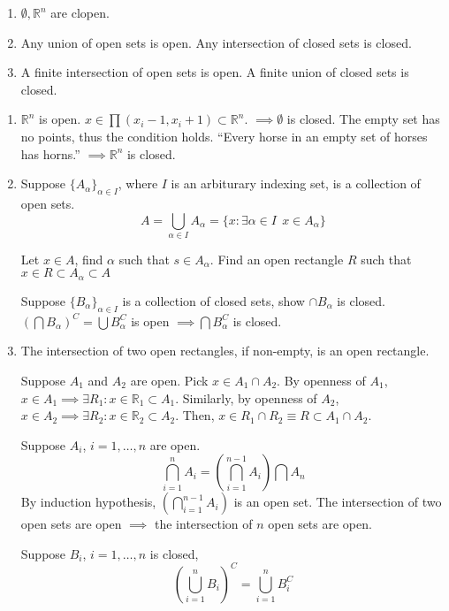 \documentclass[a4paper]{article}
\numberwithin{equation}{section}
\newcommand{\R}{\mathbb{R}}
\begin{document}
\begin{theorem}
    \begin{enumerate}
        \item $\emptyset,\R^n$ are clopen.
        \item Any union of open sets is open. Any intersection of closed sets is closed.
        \item A finite intersection of open sets is open. A finite union of closed sets is closed.
    \end{enumerate}
    \begin{prooof}
        \begin{enumerate}
            \item $\R^n$ is open. $x\in\prod(x_i-1,x_i+1)\subset\R^n$. $\implies\emptyset$ is closed. The empty set has no points, thus the condition holds. ``Every horse in an empty set of horses has horns.'' $\implies\R^n$ is closed.
            \item Suppose $\{A_\alpha\}_{\alpha\in I}$, where $I$ is an arbiturary indexing set, is a collection of open sets.
            \begin{equation}
                A=\bigcup_{\alpha\in I}A_{\alpha}=\{x:\exists\alpha\in I\:\:x\in A_\alpha\}
            \end{equation}

            Let $x\in A$, find $\alpha$ such that $s\in A_\alpha$. Find an open rectangle $R$ such that $x\in R\subset A_\alpha\subset A$

            Suppose $\{B_\alpha\}_{\alpha\in I}$ is a collection of closed sets, show $\cap B_\alpha$ is closed.
            $\left(\bigcap B_\alpha\right)^C=\bigcup B_\alpha^C$ is open $\implies\bigcap B_\alpha^C$ is closed.
            \item \begin{lemma}
                The intersection of two open rectangles, if non-empty, is an open rectangle.
            \end{lemma}
            Suppose $A_1$ and $A_2$ are open. Pick $x\in A_1\cap A_2$. By openness of $A_1$, $x\in A_1\implies\exists R_1: x\in\R_1\subset A_1$. Similarly, by openness of $A_2$, $x\in A_2\implies\exists R_2: x\in\R_2\subset A_2$. Then, $x\in R_1\cap R_2\equiv R\subset A_1\cap A_2$.

            Suppose $A_i$, $i=1,\dots,n$ are open.
            \begin{equation}
                \bigcap_{i=1}^n A_i=\left(\bigcap_{i=1}^{n-1}A_i\right)\bigcap A_n
            \end{equation}
            By induction hypothesis, $\left(\bigcap_{i=1}^{n-1}A_i\right)$ is an open set. The intersection of two open sets are open $\implies$ the intersection of $n$ open sets are open.

            Suppose $B_i$, $i=1,\dots,n$ is closed,
            \begin{equation}
                \left(\bigcup_{i=1}^nB_i\right)^C=\bigcup_{i=1}^nB_i^C
            \end{equation}        
        \end{enumerate}
    \end{prooof}
\end{theorem}
\end{document}

